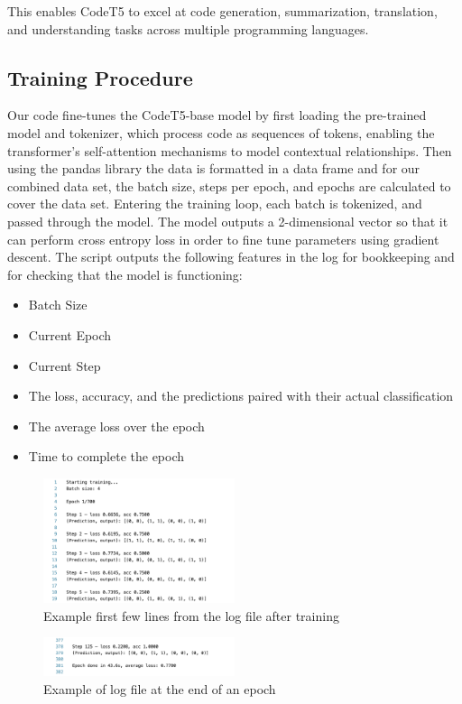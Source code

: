 \documentclass{article}
\begin{document}
This enables CodeT5 to excel at code generation, summarization, translation, and understanding tasks across multiple programming languages. 

\subsection{Training Procedure}

Our code fine-tunes the CodeT5-base model by first loading the pre-trained model and tokenizer, which process code as sequences of tokens, enabling the transformer's self-attention mechanisms to model contextual relationships. Then using the pandas library the data is formatted in a data frame and for our combined data set, the batch size, steps per epoch, and epochs are calculated to cover the data set. Entering the training loop, each batch is tokenized, and passed through the model. The model outputs a 2-dimensional vector so that it can perform cross entropy loss in order to fine tune parameters using gradient descent. The script outputs the following features in the log for bookkeeping and for checking that the model is functioning:
\begin{itemize}
\item Batch Size
\item Current Epoch
\item Current Step
\item The loss, accuracy, and the predictions paired with their actual classification
\item The average loss over the epoch
\item Time to complete the epoch
\end{itemize}

\begin{figure}[htbp]
    \centering
    \includegraphics[width=0.5\textwidth]{images/training_log_example.png}
    \caption{Example first few lines from the log file after training}
    \label{fig:training_log_example}
\end{figure}

\begin{figure}[htbp]
    \centering
    \includegraphics[width=0.5\textwidth]{images/training_log_example2.png}
    \caption{Example of log file at the end of an epoch}
    \label{fig:training_log_example2}
\end{figure}
\bigskip
\end{document}
